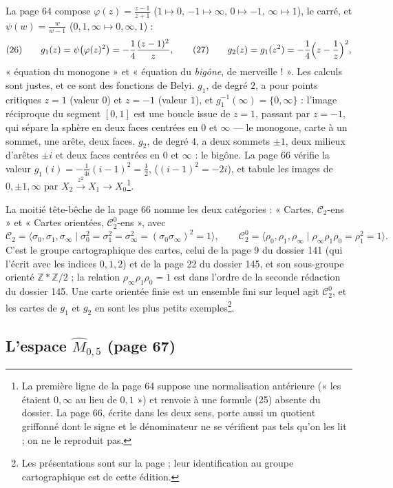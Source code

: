\documentclass[11pt,a4paper]{article}
\begin{document}
La page 64 compose $\varphi(z) = \frac{z-1}{z+1}$ ($1 \mapsto 0$, $-1 \mapsto
\infty$, $0 \mapsto -1$, $\infty \mapsto 1$), le carré, et $\psi(w) =
\frac{w}{w-1}$ ($0, 1, \infty \mapsto 0, \infty, 1$) :
\[
(26)\qquad g_1(z) = \psi\bigl(\varphi(z)^2\bigr) = -\frac14 \frac{(z-1)^2}{z},
\qquad
(27)\qquad g_2(z) = g_1(z^2) = -\frac14\Bigl(z - \frac1z\Bigr)^2,
\]
« équation du monogone » et « équation du \emph{bigône}, de merveille ! ».
Les calculs sont justes, et ce sont des fonctions de Belyi. $g_1$, de degré
$2$, a pour points critiques $z = 1$ (valeur $0$) et $z = -1$ (valeur $1$), et
$g_1^{-1}(\infty) = \{0, \infty\}$ : l'image réciproque du segment $[0,1]$ est
une boucle issue de $z = 1$, passant par $z = -1$, qui sépare la sphère en
deux faces centrées en $0$ et $\infty$ — le monogone, carte à un sommet, une
arête, deux faces. $g_2$, de degré $4$, a deux sommets $\pm 1$, deux milieux
d'arêtes $\pm i$ et deux faces centrées en $0$ et $\infty$ : le bigône. La
page 66 vérifie la valeur $g_1(i) = -\frac{1}{4i}(i-1)^2 = \frac12$, ($(i-1)^2 =
-2i$), et tabule les images de $0, \pm 1, \infty$ par $X_2 \xrightarrow{z^2}
X_1 \to X_0$\footnote{La première ligne de la page 64 suppose une
normalisation antérieure (« les étaient $0, \infty$ au lieu de $0, 1$ ») et
renvoie à une formule (25) absente du dossier. La page 66, écrite dans les
deux sens, porte aussi un quotient griffonné dont le signe et le dénominateur
ne se vérifient pas tels qu'on les lit ; on ne le reproduit pas.}.

La moitié tête-bêche de la page 66 nomme les deux catégories : « Cartes,
$\mathcal{C}_2$-ens » et « Cartes orientées, $\mathcal{C}_2^0$-ens », avec
\[
\mathcal{C}_2 = \langle \sigma_0, \sigma_1, \sigma_\infty \mid \sigma_0^2 =
\sigma_1^2 = \sigma_\infty^2 = (\sigma_0\sigma_\infty)^2 = 1 \rangle, \qquad
\mathcal{C}_2^0 = \langle \rho_0, \rho_1, \rho_\infty \mid \rho_\infty\rho_1\rho_0
= \rho_1^2 = 1 \rangle .
\]
C'est le groupe cartographique des cartes, celui de la page 9 du dossier 141
(qui l'écrit avec les indices $0, 1, 2$) et de la page 22 du dossier 145, et
son sous-groupe orienté $\mathbb{Z} * \mathbb{Z}/2$ ; la relation
$\rho_\infty\rho_1\rho_0 = 1$ est dans l'ordre de la seconde rédaction du
dossier 145. Une carte orientée finie est un ensemble fini sur lequel agit
$\mathcal{C}_2^0$, et les cartes de $g_1$ et $g_2$ en sont les plus
petits exemples\footnote{Les présentations sont sur la page ; leur
identification au groupe cartographique est de cette édition.}.

\subsection*{L'espace $\widehat{M}_{0,5}$ (page 67)}
\end{document}
